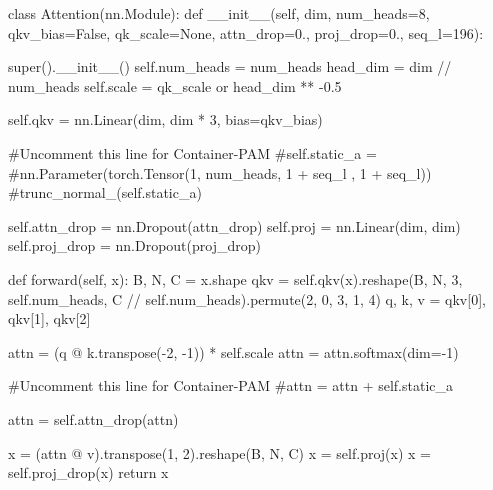 class Attention(nn.Module):
    def __init__(self, dim, num_heads=8, qkv_bias=False, qk_scale=None, attn_drop=0., proj_drop=0., seq_l=196):
    
       super().__init__()
        self.num_heads = num_heads
        head_dim = dim // num_heads
        self.scale = qk_scale or head_dim ** -0.5

        self.qkv = nn.Linear(dim, dim * 3, bias=qkv_bias)
        
        #Uncomment this line for Container-PAM
        #self.static_a = 
        #nn.Parameter(torch.Tensor(1, num_heads, 1 + seq_l , 1 + seq_l))
        #trunc_normal_(self.static_a)
        
        self.attn_drop = nn.Dropout(attn_drop)
        self.proj = nn.Linear(dim, dim)
        self.proj_drop = nn.Dropout(proj_drop)

    def forward(self, x):
        B, N, C = x.shape
        qkv = self.qkv(x).reshape(B, N, 3, self.num_heads, C // self.num_heads).permute(2, 0, 3, 1, 4)
        q, k, v = qkv[0], qkv[1], qkv[2]   

        attn = (q @ k.transpose(-2, -1)) * self.scale
        attn = attn.softmax(dim=-1)
        
        #Uncomment this line for Container-PAM
        #attn = attn + self.static_a
        
        attn = self.attn_drop(attn)

        x = (attn @ v).transpose(1, 2).reshape(B, N, C)
        x = self.proj(x)
        x = self.proj_drop(x)
        return x